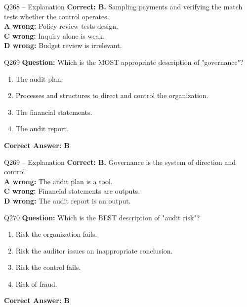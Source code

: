 \documentclass[aspectratio=169,10pt]{beamer}
\begin{document}
	\begin{frame}[t]{Q268 -- Explanation}
		\small
		\textbf{Correct: B.} Sampling payments and verifying the match tests whether the control operates. \\[4pt]
		\textbf{A wrong:} Policy review tests design. \\[2pt]
		\textbf{C wrong:} Inquiry alone is weak. \\[2pt]
		\textbf{D wrong:} Budget review is irrelevant.
	\end{frame}
	
	\begin{frame}[t]{Q269}
		\small
		\textbf{Question:} Which is the MOST appropriate description of "governance"?
		\begin{enumerate}[label=\Alph*.,itemsep=1pt,topsep=2pt]
			\item The audit plan.
			\item Processes and structures to direct and control the organization.
			\item The financial statements.
			\item The audit report.
		\end{enumerate}
		\vspace{4pt}
		\textbf{Correct Answer: B}
	\end{frame}
	
	\begin{frame}[t]{Q269 -- Explanation}
		\small
		\textbf{Correct: B.} Governance is the system of direction and control. \\[4pt]
		\textbf{A wrong:} The audit plan is a tool. \\[2pt]
		\textbf{C wrong:} Financial statements are outputs. \\[2pt]
		\textbf{D wrong:} The audit report is an output.
	\end{frame}
	
	\begin{frame}[t]{Q270}
		\small
		\textbf{Question:} Which is the BEST description of "audit risk"?
		\begin{enumerate}[label=\Alph*.,itemsep=1pt,topsep=2pt]
			\item Risk the organization fails.
			\item Risk the auditor issues an inappropriate conclusion.
			\item Risk the control fails.
			\item Risk of fraud.
		\end{enumerate}
		\vspace{4pt}
		\textbf{Correct Answer: B}
	\end{frame}
	
\end{document}
